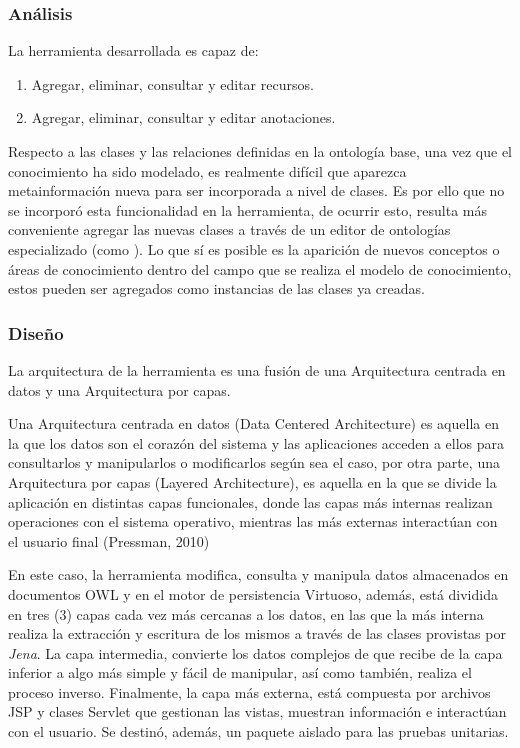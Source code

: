 \begin{itemize}
\subsubsection{Análisis}
La herramienta desarrollada es capaz de:

\begin{enumerate}
    \item Agregar, eliminar, consultar y editar recursos.
    \item Agregar, eliminar, consultar y editar anotaciones.
\end{enumerate}

Respecto a las clases y las relaciones definidas en la ontología base, una vez que el conocimiento ha sido modelado, es realmente difícil que aparezca metainformación nueva para ser incorporada a nivel de clases. Es por ello que no se incorporó esta funcionalidad en la herramienta, de ocurrir esto, resulta más conveniente agregar las nuevas clases a través de un editor de ontologías especializado (como ). Lo que sí es posible es la aparición de nuevos conceptos o áreas de conocimiento dentro del campo que se realiza el modelo de conocimiento, estos pueden ser agregados como instancias de las clases ya creadas.

\subsubsection{Diseño}
La arquitectura de la herramienta es una fusión de una Arquitectura centrada en datos y una Arquitectura por capas.  

Una Arquitectura centrada en datos (Data Centered Architecture) es aquella en la que los datos son el corazón del sistema y las aplicaciones acceden a ellos para consultarlos y manipularlos o modificarlos según sea el caso, por otra parte, una Arquitectura por capas (Layered Architecture), es aquella en la que se divide la aplicación en distintas capas funcionales, donde las capas más internas realizan operaciones con el sistema operativo, mientras las más externas interactúan con el usuario final (Pressman, 2010)

En este caso, la herramienta modifica, consulta y manipula datos almacenados en documentos OWL y en el motor de persistencia Virtuoso, además, está dividida en tres (3) capas cada vez más cercanas a los datos, en las que la más interna realiza la extracción y escritura de los mismos a través de las clases provistas por \textit{Jena}. La capa intermedia, convierte los datos complejos de que recibe de la capa inferior a algo más simple y fácil de manipular, así como también, realiza el proceso inverso. Finalmente, la capa más externa, está compuesta por archivos JSP y clases Servlet que gestionan las vistas, muestran información e interactúan con el usuario. Se destinó, además, un paquete aislado para las pruebas unitarias.


\end{itemize}

